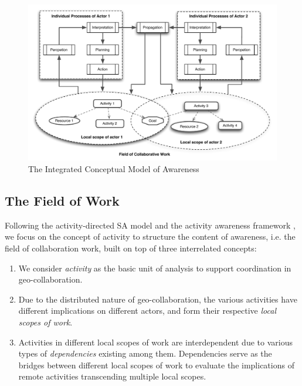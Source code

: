 
\begin{figure}[htbp] %
   \centering
   \includegraphics[width=5.5in]{conceptual_framework.pdf} 
   \caption{The Integrated Conceptual Model of Awareness}
   \label{fig:conceptual_framework}
\end{figure}

\subsection{The Field of Work} %
\label{sub:the_field_of_work}
Following the activity-directed SA model \cite{Bedny1999} and the activity awareness framework \cite{carroll2003a}, we focus on the concept of activity to structure the content of awareness, i.e. the field of collaboration work, built on top of three interrelated concepts:

\begin{enumerate}
	\item We consider \emph{activity} as the basic unit of analysis to support coordination in geo-collaboration.
	\item Due to the distributed nature of geo-collaboration, the various activities have different implications on different actors, and form their respective \emph{local scopes of work}.
	\item Activities in different local scopes of work are interdependent due to various types of \emph{dependencies} existing among them. Dependencies serve as the bridges between different local scopes of work to evaluate the implications of remote activities transcending multiple local scopes. 
	
\end{enumerate}

